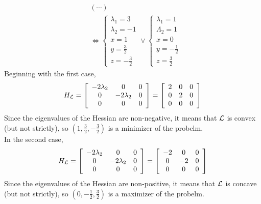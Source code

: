 {\begin{align*}
        & (\cdots)\\
        & \Leftrightarrow \begin{cases*}
            \lambda_1 = 3\\
            \lambda_2 = -1\\
            x = 1\\
            y = \frac{3}{2}\\
            z = -\frac{3}{2}
        \end{cases*} \lor \begin{cases*}
            \lambda_1 = 1\\
            \Lambda_2 = 1\\
            x = 0\\
            y = -\frac{1}{2}\\
            z = \frac{3}{2}
        \end{cases*}
    \end{align*}
    Beginning with the first case,
    \begin{equation*}
        H_{\mathcal{L}} = \left[\begin{array}{ccc}
            -2\lambda_2 & 0 & 0\\
            0 & -2\lambda_2 & 0\\
            0 & 0 & 0
        \end{array}\right] = \left[\begin{array}{ccc}
            2 & 0 & 0\\
            0 & 2 & 0\\
            0 & 0 & 0
        \end{array}\right]
    \end{equation*}
    Since the eigenvalues of the Hessian are non-negative, it means that $\mathcal{L}$ is convex (but not strictly),
    so $(1, \frac{3}{2}, -\frac{3}{2})$ is a minimizer of the probelm.\\

    In the second case,
    \begin{equation*}
        H_{\mathcal{L}} = \left[\begin{array}{ccc}
            -2\lambda_2 & 0 & 0\\
            0 & -2\lambda_2 & 0\\
            0 & 0 & 0
        \end{array}\right] = \left[\begin{array}{ccc}
            -2 & 0 & 0\\
            0 & -2 & 0\\
            0 & 0 & 0
        \end{array}\right]
    \end{equation*}
    Since the eigenvalues of the Hessian are non-positive, it means that $\mathcal{L}$ is concave (but not strictly),
    so $(0, -\frac{1}{2}, \frac{3}{2})$ is a maximizer of the probelm.
}

